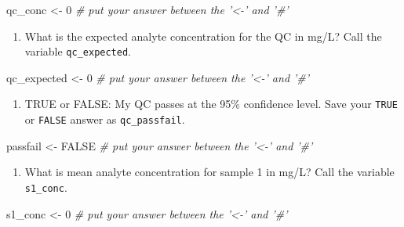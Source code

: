 \documentclass[]{tufte-book}
\newenvironment{Shaded}{}{}
\newcommand{\CommentTok}[1]{\textcolor[rgb]{0.38,0.63,0.69}{\textit{#1}}}
\newcommand{\DecValTok}[1]{\textcolor[rgb]{0.25,0.63,0.44}{#1}}
\newcommand{\NormalTok}[1]{#1}
\newcommand{\OtherTok}[1]{\textcolor[rgb]{0.00,0.44,0.13}{#1}}
\newcommand{\StringTok}[1]{\textcolor[rgb]{0.25,0.44,0.63}{#1}}
\providecommand{\tightlist}{%
  \setlength{\itemsep}{0pt}\setlength{\parskip}{0pt}}
\begin{document}
\begin{Shaded}
\begin{Highlighting}[]
\NormalTok{qc_conc <-}\StringTok{ }\DecValTok{0}     \CommentTok{# put your answer between the '<-' and '#'}
\end{Highlighting}
\end{Shaded}

\begin{enumerate}
\def\labelenumi{\arabic{enumi}.}
\setcounter{enumi}{3}
\tightlist
\item
  What is the expected analyte concentration for the QC in mg/L? Call the variable \texttt{qc\_expected}.
\end{enumerate}

\begin{Shaded}
\begin{Highlighting}[]
\NormalTok{qc_expected <-}\StringTok{ }\DecValTok{0}     \CommentTok{# put your answer between the '<-' and '#'}
\end{Highlighting}
\end{Shaded}

\begin{enumerate}
\def\labelenumi{\arabic{enumi}.}
\setcounter{enumi}{4}
\tightlist
\item
  TRUE or FALSE: My QC passes at the 95\% confidence level. Save your \texttt{TRUE} or \texttt{FALSE} answer as \texttt{qc\_passfail}.
\end{enumerate}

\begin{Shaded}
\begin{Highlighting}[]
\NormalTok{passfail <-}\StringTok{ }\OtherTok{FALSE}     \CommentTok{# put your answer between the '<-' and '#'}
\end{Highlighting}
\end{Shaded}

\begin{enumerate}
\def\labelenumi{\arabic{enumi}.}
\setcounter{enumi}{5}
\tightlist
\item
  What is mean analyte concentration for sample 1 in mg/L? Call the variable \texttt{s1\_conc}.
\end{enumerate}

\begin{Shaded}
\begin{Highlighting}[]
\NormalTok{s1_conc <-}\StringTok{ }\DecValTok{0}     \CommentTok{# put your answer between the '<-' and '#'}
\end{Highlighting}
\end{Shaded}
\end{document}
